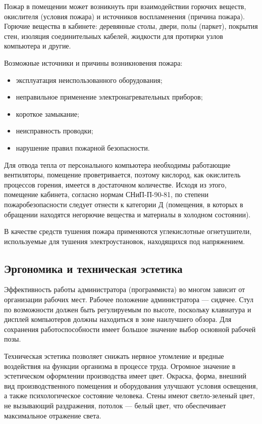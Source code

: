Пожар в помещении может возникнуть при взаимодействии горючих веществ, окислителя (условия пожара) и источников воспламенения (причина пожара).
Горючие вещества в кабинете: деревянные столы, двери, полы (паркет), покрытия стен, изоляция соединительных кабелей, жидкости для протирки узлов компьютера и другие.

Возможные источники и причины возникновения пожара:
\begin{itemize}
  \item эксплуатация неиспользованного оборудования;
  \item неправильное применение электронагревательных приборов;
  \item короткое замыкание;
  \item неисправность проводки;
  \item нарушение правил пожарной безопасности.
\end{itemize}

Для отвода тепла от персонального компьютера необходимы работающие вентиляторы, помещение проветривается, поэтому кислород, как окислитель процессов горения, имеется в достаточном количестве.
Исходя из этого, помещение кабинета, согласно нормам СНиП-П-90-81, по степени пожаробезопасности следует отнести к категории Д (помещения, в которых в обращении находятся негорючие вещества и материалы в холодном состоянии).

В качестве средств тушения пожара применяются углекислотные огнетушители, используемые для тушения электроустановок, находящихся под напряжением.

\subsection{Эргономика и техническая эстетика}

Эффективность работы администратора (программиста) во многом зависит от организации рабочих мест.
Рабочее положение администратора --- сидячее.
Стул по возможности должен быть регулируемым по высоте, поскольку клавиатура и дисплей компьютеров должны находиться в зоне наилучшего обзора.
Для сохранения работоспособности имеет большое значение выбор основной рабочей позы.

Техническая эстетика позволяет снижать нервное утомление и вредные воздействия на функции организма в процессе труда.
Огромное значение в эстетическом оформлении производства имеет цвет.
Окраска, форма, внешний вид производственного помещения и оборудования улучшают условия освещения, а также психологическое состояние человека. Стены имеют светло-зеленый цвет, не вызывающий раздражения, потолок --- белый цвет, что обеспечивает максимальное отражение света.

